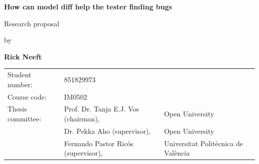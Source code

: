 \documentclass{ou-report-vaf}
\begin{document}

\pagestyle{plain}
\begin{titlepage}
\begin{center}


\vspace*{2\bigskipamount}

{\color{red}\Huge\bf How can model diff help the tester finding bugs}
\bigskip

{\large Research proposal}

\bigskip \bigskip
by
\bigskip \bigskip

{\Large\bf Rick Neeft}

\bigskip \bigskip\bigskip \bigskip

\begin{tabular}{lll}
    Student number: & 851829973 \\
    Course code: & \textsc{IM}0502\\
    Thesis committee:
        & Prof. Dr. Tanja E.J. Vos (chairman), & Open University \\
        & Dr. Pekka Aho (supervisor), & Open University \\
        & Fernando Pastor Ricós (supervisor), & Universitat Politècnica de València
\end{tabular}

\end{center}
\end{titlepage}

\let\cleardoublepage\clearpage
\end{document}
